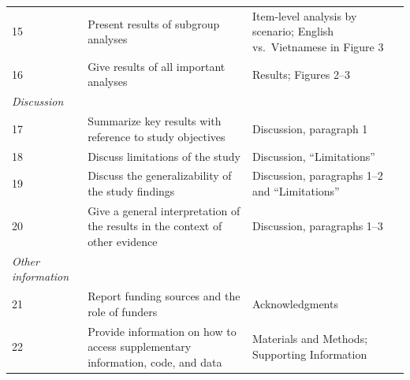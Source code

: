 \documentclass{article}
\begin{document}
\begin{singlespace}
\begin{longtable}{p{}p{}p{}}
15 & Present results of subgroup analyses & Item-level analysis by scenario; English vs.\ Vietnamese in Figure 3 \\

16 & Give results of all important analyses & Results; Figures 2--3 \\

\midrule
\textit{Discussion} & & \\
\midrule

17 & Summarize key results with reference to study objectives & Discussion, paragraph 1 \\

18 & Discuss limitations of the study & Discussion, ``Limitations'' \\

19 & Discuss the generalizability of the study findings & Discussion, paragraphs 1--2 and ``Limitations'' \\

20 & Give a general interpretation of the results in the context of other evidence & Discussion, paragraphs 1--3 \\

\midrule
\textit{Other information} & & \\
\midrule

21 & Report funding sources and the role of funders & Acknowledgments \\

22 & Provide information on how to access supplementary information, code, and data & Materials and Methods; Supporting Information \\

\end{longtable}
\end{singlespace}
\end{document}
